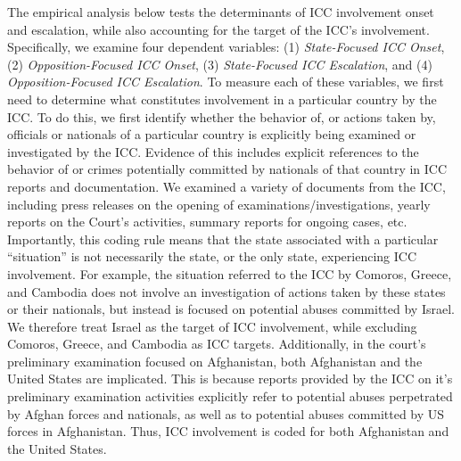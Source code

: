 The empirical analysis below tests the determinants of ICC involvement onset and escalation, while also accounting for the target of the ICC's involvement. Specifically, we examine four dependent variables: (1) \emph{State-Focused ICC Onset}, (2) \emph{Opposition-Focused ICC Onset}, (3) \emph{State-Focused ICC Escalation}, and (4) \emph{Opposition-Focused ICC Escalation}. To measure each of these variables, we first need to determine what constitutes involvement in a particular country by the ICC. To do this, we first identify whether the behavior of, or actions taken by, officials or nationals of a particular country is explicitly being examined or investigated by the ICC. Evidence of this includes explicit references to the behavior of or crimes potentially committed by nationals of that country in ICC reports and documentation. We examined a variety of documents from the ICC, including press releases on the opening of examinations/investigations, yearly reports on the Court's activities, summary reports for ongoing cases, etc. Importantly, this coding rule means that the state associated with a particular ``situation'' is not necessarily the state, or the only state, experiencing ICC involvement. For example, the situation referred to the ICC by Comoros, Greece, and Cambodia does not involve an investigation of actions taken by these states or their nationals, but instead is focused on potential abuses committed by Israel. We therefore treat Israel as the target of ICC involvement, while excluding Comoros, Greece, and Cambodia as ICC targets. Additionally, in the court's preliminary examination focused on Afghanistan, both Afghanistan and the United States are implicated. This is because reports provided by the ICC on it's preliminary examination activities explicitly refer to potential abuses perpetrated by Afghan forces and nationals, as well as to potential abuses committed by US forces in Afghanistan. Thus, ICC involvement is coded for both Afghanistan and the United States.


